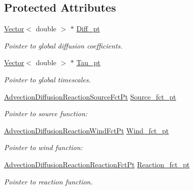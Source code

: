 \subsection*{Protected Attributes}
\begin{DoxyCompactItemize}
\item 
\hyperlink{classoomph_1_1Vector}{Vector}$<$ double $>$ $\ast$ \hyperlink{classoomph_1_1AdvectionDiffusionReactionEquations_af88a7b3b2daee6c339ee75914ae1c23e}{Diff\+\_\+pt}
\begin{DoxyCompactList}\small\item\em Pointer to global diffusion coefficients. \end{DoxyCompactList}\item 
\hyperlink{classoomph_1_1Vector}{Vector}$<$ double $>$ $\ast$ \hyperlink{classoomph_1_1AdvectionDiffusionReactionEquations_a50ac4110c6bf38ada794fd25cb88431b}{Tau\+\_\+pt}
\begin{DoxyCompactList}\small\item\em Pointer to global timescales. \end{DoxyCompactList}\item 
\hyperlink{classoomph_1_1AdvectionDiffusionReactionEquations_a3443e579e62414ecc50595403982e686}{Advection\+Diffusion\+Reaction\+Source\+Fct\+Pt} \hyperlink{classoomph_1_1AdvectionDiffusionReactionEquations_a1a79762a4b988e4feda96a5a8678c9ce}{Source\+\_\+fct\+\_\+pt}
\begin{DoxyCompactList}\small\item\em Pointer to source function\+: \end{DoxyCompactList}\item 
\hyperlink{classoomph_1_1AdvectionDiffusionReactionEquations_a2fff621b5b44c64bd5b3f0412201055f}{Advection\+Diffusion\+Reaction\+Wind\+Fct\+Pt} \hyperlink{classoomph_1_1AdvectionDiffusionReactionEquations_aa45dd8734c1d321329c522b6db8d0590}{Wind\+\_\+fct\+\_\+pt}
\begin{DoxyCompactList}\small\item\em Pointer to wind function\+: \end{DoxyCompactList}\item 
\hyperlink{classoomph_1_1AdvectionDiffusionReactionEquations_a74f8f0492147a5600b075cc64479f850}{Advection\+Diffusion\+Reaction\+Reaction\+Fct\+Pt} \hyperlink{classoomph_1_1AdvectionDiffusionReactionEquations_ae0232ca6f0b4cf18afbd893ec289f097}{Reaction\+\_\+fct\+\_\+pt}
\begin{DoxyCompactList}\small\item\em Pointer to reaction function. \end{DoxyCompactList}\item 

\end{DoxyCompactItemize}
